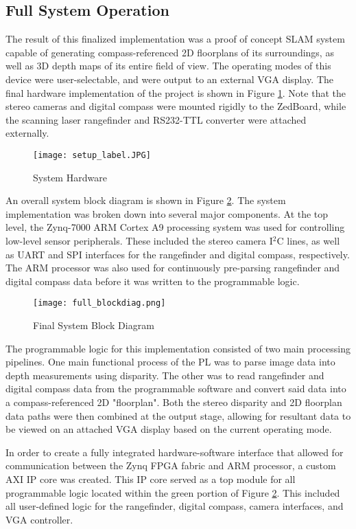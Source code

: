 \subsection{Full System Operation}
The result of this finalized implementation was a proof of concept SLAM system capable of generating compass-referenced 2D floorplans of its surroundings, as well as 3D depth maps of its entire field of view. The operating modes of this device were user-selectable, and were output to an external VGA display. The final hardware implementation of the project is shown in Figure \ref{finalHW}. Note that the stereo cameras and digital compass were mounted rigidly to the ZedBoard, while the scanning laser rangefinder and RS232-TTL converter were attached externally.
\par
\begin{figure}[H]
	\centerline{
	\texttt{[image: setup\_label.JPG]}
	}
	\caption{System Hardware}
	\label{finalHW}
\end{figure}
\par
An overall system block diagram is shown in Figure \ref{systemBD2}. The system implementation was broken down into several major components. At the top level, the Zynq-7000 ARM Cortex A9 processing system was used for controlling low-level sensor peripherals. These included the stereo camera I$^2$C lines, as well as UART and SPI interfaces for the rangefinder and digital compass, respectively. The ARM processor was also used for continuously pre-parsing rangefinder and digital compass data before it was written to the programmable logic.
\par
\begin{figure}[H]
	\centerline{
	\texttt{[image: full\_blockdiag.png]}
	}
	\caption{Final System Block Diagram}
	\label{systemBD2}
\end{figure}
\par
The programmable logic for this implementation consisted of two main processing pipelines. One main functional process of the PL was to parse image data into depth measurements using disparity. The other was to read rangefinder and digital compass data from the programmable software and convert said data into a compass-referenced 2D "floorplan". Both the stereo disparity and 2D floorplan data paths were then combined at the output stage, allowing for resultant data to be viewed on an attached VGA display based on the current operating mode.
\par
In order to create a fully integrated hardware-software interface that allowed for communication between the Zynq FPGA fabric and ARM processor, a custom AXI IP core was created. This IP core served as a top module for all programmable logic located within the green portion of Figure \ref{systemBD2}. This included all user-defined logic for the rangefinder, digital compass, camera interfaces, and VGA controller.
